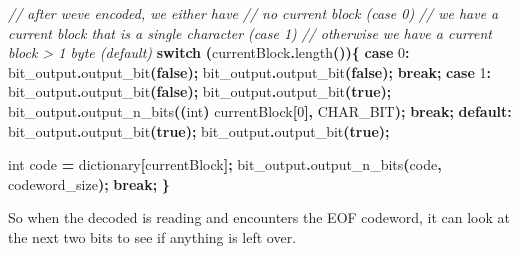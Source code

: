 \documentclass[12pt,twoside]{reedthesis}
\newenvironment{Shaded}{\begin{snugshade}}{\end{snugshade}}
\newcommand{\CommentTok}[1]{\textcolor[rgb]{0.56,0.35,0.01}{\textit{#1}}}
\newcommand{\ControlFlowTok}[1]{\textcolor[rgb]{0.13,0.29,0.53}{\textbf{#1}}}
\newcommand{\DataTypeTok}[1]{\textcolor[rgb]{0.13,0.29,0.53}{#1}}
\newcommand{\DecValTok}[1]{\textcolor[rgb]{0.00,0.00,0.81}{#1}}
\newcommand{\KeywordTok}[1]{\textcolor[rgb]{0.13,0.29,0.53}{\textbf{#1}}}
\newcommand{\NormalTok}[1]{#1}
\newcommand{\OperatorTok}[1]{\textcolor[rgb]{0.81,0.36,0.00}{\textbf{#1}}}
\begin{document}
\begin{Shaded}
\begin{Highlighting}[]
\CommentTok{// after we\textquotesingle{}ve encoded, we either have }
\CommentTok{// no current block (case 0)}
\CommentTok{// we have a current block that is a single character (case 1)}
\CommentTok{// otherwise we have a current block \textgreater{} 1 byte (default)}
\ControlFlowTok{switch} \OperatorTok{(}\NormalTok{currentBlock}\OperatorTok{.}\NormalTok{length}\OperatorTok{())\{}
\ControlFlowTok{case} \DecValTok{0}\OperatorTok{:}
\NormalTok{    bit\_output}\OperatorTok{.}\NormalTok{output\_bit}\OperatorTok{(}\KeywordTok{false}\OperatorTok{);}
\NormalTok{    bit\_output}\OperatorTok{.}\NormalTok{output\_bit}\OperatorTok{(}\KeywordTok{false}\OperatorTok{);}
    \ControlFlowTok{break}\OperatorTok{;}
\ControlFlowTok{case} \DecValTok{1}\OperatorTok{:}
\NormalTok{    bit\_output}\OperatorTok{.}\NormalTok{output\_bit}\OperatorTok{(}\KeywordTok{false}\OperatorTok{);}
\NormalTok{    bit\_output}\OperatorTok{.}\NormalTok{output\_bit}\OperatorTok{(}\KeywordTok{true}\OperatorTok{);}
\NormalTok{    bit\_output}\OperatorTok{.}\NormalTok{output\_n\_bits}\OperatorTok{((}\DataTypeTok{int}\OperatorTok{)}\NormalTok{ currentBlock}\OperatorTok{[}\DecValTok{0}\OperatorTok{],}\NormalTok{ CHAR\_BIT}\OperatorTok{);}
    \ControlFlowTok{break}\OperatorTok{;}
\ControlFlowTok{default}\OperatorTok{:}
\NormalTok{    bit\_output}\OperatorTok{.}\NormalTok{output\_bit}\OperatorTok{(}\KeywordTok{true}\OperatorTok{);}
\NormalTok{    bit\_output}\OperatorTok{.}\NormalTok{output\_bit}\OperatorTok{(}\KeywordTok{true}\OperatorTok{);}

    \DataTypeTok{int}\NormalTok{ code }\OperatorTok{=}\NormalTok{ dictionary}\OperatorTok{[}\NormalTok{currentBlock}\OperatorTok{];}
\NormalTok{    bit\_output}\OperatorTok{.}\NormalTok{output\_n\_bits}\OperatorTok{(}\NormalTok{code}\OperatorTok{,}\NormalTok{ codeword\_size}\OperatorTok{);}
    \ControlFlowTok{break}\OperatorTok{;}
\OperatorTok{\}}
\end{Highlighting}
\end{Shaded}
So when the decoded is reading and encounters the EOF codeword, it can look at the next two bits to see if anything is left over.
\end{document}
